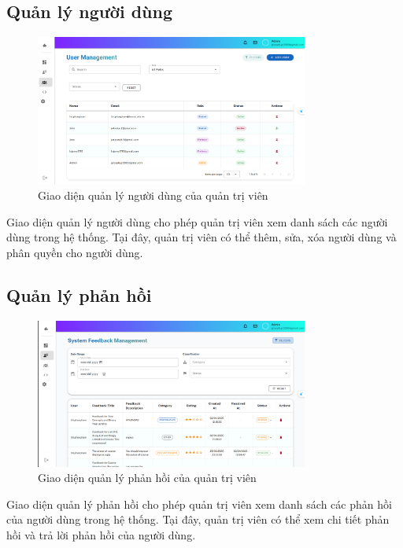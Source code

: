 \subsection{Quản lý người dùng}
\begin{figure}[H]
    \centering
    \includegraphics[width=0.8\textwidth]{images/CapScreen_Admin/user.png}
    \caption{Giao diện quản lý người dùng của quản trị viên}
    \label{fig:admin_user_page}
\end{figure}
Giao diện quản lý người dùng cho phép quản trị viên xem danh sách các người dùng trong hệ thống. Tại đây, quản trị viên có thể thêm, sửa, xóa người dùng và phân quyền cho người dùng.
\subsection{Quản lý phản hồi}
\begin{figure}[H]
    \centering
    \includegraphics[width=0.8\textwidth]{images/CapScreen_Admin/feedback.png}
    \caption{Giao diện quản lý phản hồi của quản trị viên}
    \label{fig:admin_feedback_page}
\end{figure}
Giao diện quản lý phản hồi cho phép quản trị viên xem danh sách các phản hồi của người dùng trong hệ thống. Tại đây, quản trị viên có thể xem chi tiết phản hồi và trả lời phản hồi của người dùng.

